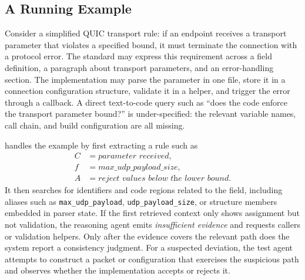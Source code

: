 \subsection{A Running Example}

Consider a simplified QUIC transport rule: if an endpoint receives a transport
parameter that violates a specified bound, it must terminate the connection with
a protocol error. The standard may express this requirement across a field
definition, a paragraph about transport parameters, and an error-handling
section. The implementation may parse the parameter in one file, store it in a
connection configuration structure, validate it in a helper, and trigger the
error through a callback. A direct text-to-code query such as ``does the code
enforce the transport parameter bound?'' is under-specified: the relevant
variable names, call chain, and build configuration are all missing.

\tool{} handles the example by first extracting a rule such as
\[
\begin{aligned}
C &= \textit{parameter received},\\
f &= \textit{max\_udp\_payload\_size},\\
A &= \textit{reject values below the lower bound}.
\end{aligned}
\]
It then searches for identifiers and code regions related to the field,
including aliases such as \texttt{max\_udp\_payload},
\texttt{udp\_payload\_size}, or structure members embedded in parser state.
If the first retrieved context only shows assignment but not validation, the
reasoning agent emits \emph{insufficient evidence} and requests callers or
validation helpers. Only after the evidence covers the relevant path does the
system report a consistency judgment. For a suspected deviation, the test agent
attempts to construct a packet or configuration that exercises the suspicious
path and observes whether the implementation accepts or rejects it.


